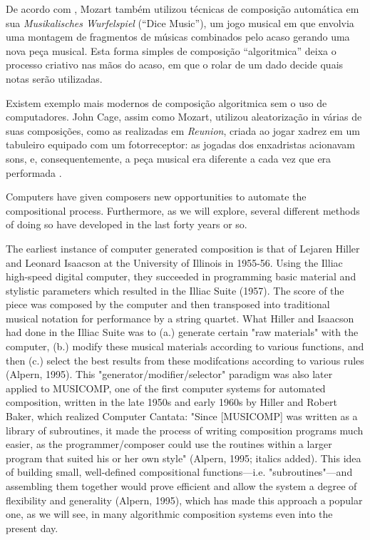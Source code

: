 \documentclass{automatextcc}
\begin{document}
De acordo com \cite{alpern1995}, Mozart também utilizou técnicas de composição automática em sua \textit{Musikalisches Wurfelspiel} (``Dice Music''), um jogo musical em que envolvia uma montagem de fragmentos de músicas combinados pelo acaso gerando uma nova peça musical. Esta forma simples de composição ``algoritmica'' deixa o processo criativo nas mãos do acaso, em que o rolar de um dado decide quais notas serão utilizadas.

Existem exemplo mais modernos de composição algoritmica sem o uso de computadores. John Cage, assim como Mozart, utilizou aleatorização in várias de suas composições, como as realizadas em \textit{Reunion}, criada ao jogar xadrez em um tabuleiro equipado com um fotorreceptor: as jogadas dos enxadristas acionavam sons, e, consequentemente, a peça musical era diferente a cada vez que era performada \citep{alpern1995}.





Computers have given composers new opportunities to automate the compositional process. Furthermore, as we will explore, several different methods of doing so have developed in the last forty years or so.

The earliest instance of computer generated composition is that of Lejaren Hiller and Leonard Isaacson at the University of Illinois in 1955-56. Using the Illiac high-speed digital computer, they succeeded in programming basic material and stylistic parameters which resulted in the Illiac Suite (1957). The score of the piece was composed by the computer and then transposed into traditional musical notation for performance by a string quartet. What Hiller and Isaacson had done in the Illiac Suite was to (a.) generate certain "raw materials" with the computer, (b.) modify these musical materials according to various functions, and then (c.) select the best results from these modifcations according to various rules (Alpern, 1995). This "generator/modifier/selector" paradigm was also later applied to MUSICOMP, one of the first computer systems for automated composition, written in the late 1950s and early 1960s by Hiller and Robert Baker, which realized Computer Cantata: "Since [MUSICOMP] was written as a library of subroutines, it made the process of writing composition programs much easier, as the programmer/composer could use the routines within a larger program that suited his or her own style" (Alpern, 1995; italics added). This idea of building small, well-defined compositional functions—i.e. "subroutines"—and assembling them together would prove efficient and allow the system a degree of flexibility and generality (Alpern, 1995), which has made this approach a popular one, as we will see, in many algorithmic composition systems even into the present day.
\end{document}
